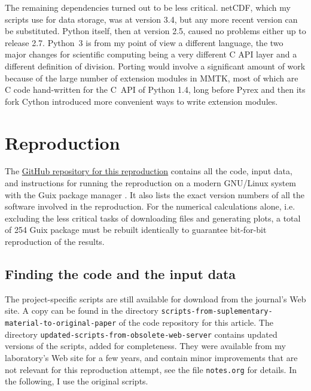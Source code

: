 The remaining dependencies turned out to be less critical. netCDF, which my scripts use for data storage, was at version 3.4, but any more recent version can be substituted. Python itself, then at version 2.5, caused no problems either up to release 2.7. Python~3 is from my point of view a different language, the two major changes for scientific computing being a very different C API layer and a different definition of division. Porting would involve a significant amount of work because of the large number of extension modules in MMTK, most of which are C code hand-written for the C~API of Python 1.4, long before Pyrex \cite{EwingPyrex} and then its fork Cython \cite{BehnelCythonBestBoth2011} introduced more convenient ways to write extension modules.

\section*{Reproduction}

The \href{https://github.com/khinsen/rescience-ten-year-challenge-paper-3}{GitHub repository for this reproduction} contains all the code, input data, and instructions for running the reproduction on a modern GNU/Linux system with the Guix package manager \cite{CourtesReproducibleUserControlledSoftware2015,WurmusPiGxreproduciblegenomics2018}. It also lists the exact version numbers of all the software involved in the reproduction. For the numerical calculations alone, i.e. excluding the less critical tasks of downloading files and generating plots, a total of 254 Guix package must be rebuilt identically to guarantee bit-for-bit reproduction of the results.

\subsection*{Finding the code and the input data}

The project-specific scripts are still available for download from the journal's Web site. A copy can be found in the directory \texttt{scripts-from-suplementary-material-to-original-paper} of the code repository for this article. The directory \texttt{updated-scripts-from-obsolete-web-server} contains updated versions of the scripts, added for completeness. They were available from my laboratory's Web site for a few years, and contain minor improvements that are not relevant for this reproduction attempt, see the file \texttt{notes.org} for details. In the following, I use the original scripts.

